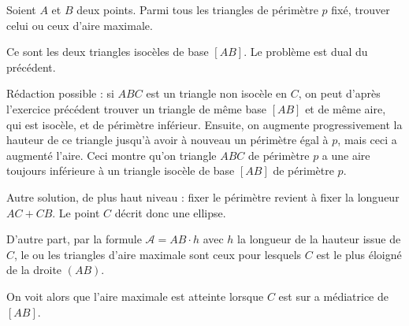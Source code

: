 \begin{exo}
\label{base_fixee}
Soient $A$ et $B$ deux points. Parmi tous les triangles de périmètre $p$ fixé, trouver celui ou ceux d'aire maximale.
\begin{sol}


Ce sont les deux triangles isocèles de base $[AB]$. Le problème est dual du précédent.

Rédaction possible : si $ABC$ est un triangle non isocèle en $C$, on peut d'après l'exercice précédent trouver un triangle de même base $[AB]$ et de même aire, qui est isocèle, et de périmètre inférieur. Ensuite, on augmente progressivement la hauteur de ce triangle jusqu'à avoir à nouveau un périmètre égal à $p$, mais ceci a augmenté l'aire. Ceci montre qu'on triangle $ABC$ de périmètre $p$ a une aire toujours inférieure à un triangle isocèle de base $[AB]$ de périmètre $p$.



Autre solution, de plus haut niveau : fixer le périmètre revient à fixer la longueur $AC+CB$. Le point $C$ décrit donc une ellipse.

D'autre part,  par la formule $\mathcal A = AB \cdot h$ avec $h$ la longueur de la hauteur issue de $C$, le  ou les triangles d'aire maximale sont ceux pour lesquels $C$ est le plus éloigné de la droite $(AB)$.

On voit alors que l'aire maximale est atteinte lorsque $C$ est sur a médiatrice de $[AB]$.
\end{sol}
\end{exo}

